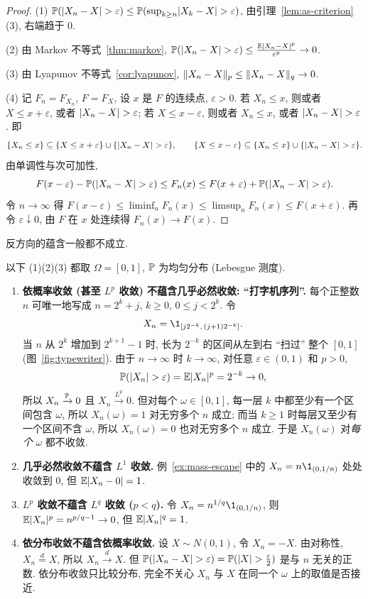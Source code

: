\begin{proof}
(1) $\P(\abs{X_n-X}>\varepsilon)\le\P(\sup_{k\ge n}\abs{X_k-X}>\varepsilon)$, 由引理~\ref{lem:as-criterion} (3), 右端趋于 $0$.

(2) 由 Markov 不等式~\ref{thm:markov}, $\P(\abs{X_n-X}>\varepsilon)\le\frac{\E\abs{X_n-X}^p}{\varepsilon^p}\to0$.

(3) 由 Lyapunov 不等式~\ref{cor:lyapunov}, $\norm{X_n-X}_p\le\norm{X_n-X}_q\to0$.

(4) 记 $F_n=F_{X_n}$, $F=F_X$, 设 $x$ 是 $F$ 的连续点, $\varepsilon>0$. 若 $X_n\le x$, 则或者 $X\le x+\varepsilon$, 或者 $\abs{X_n-X}>\varepsilon$; 若 $X\le x-\varepsilon$, 则或者 $X_n\le x$, 或者 $\abs{X_n-X}>\varepsilon$. 即
\[
\{X_n\le x\}\subseteq\{X\le x+\varepsilon\}\cup\{\abs{X_n-X}>\varepsilon\},\qquad
\{X\le x-\varepsilon\}\subseteq\{X_n\le x\}\cup\{\abs{X_n-X}>\varepsilon\}.
\]
由单调性与次可加性,
\[
F(x-\varepsilon)-\P(\abs{X_n-X}>\varepsilon)\le F_n(x)\le F(x+\varepsilon)+\P(\abs{X_n-X}>\varepsilon).
\]
令 $n\to\infty$ 得 $F(x-\varepsilon)\le\liminf_n F_n(x)\le\limsup_n F_n(x)\le F(x+\varepsilon)$. 再令 $\varepsilon\downarrow0$, 由 $F$ 在 $x$ 处连续得 $F_n(x)\to F(x)$.
\end{proof}

反方向的蕴含一般都不成立.

\begin{example}[反例]\label{ex:convergence-counterexamples}
以下 (1)(2)(3) 都取 $\Omega=[0,1]$, $\P$ 为均匀分布 (Lebesgue 测度).
\begin{enumerate}
\item \textbf{依概率收敛 (甚至 $L^p$ 收敛) 不蕴含几乎必然收敛: ``打字机序列''.} 每个正整数 $n$ 可唯一地写成 $n=2^k+j$, $k\ge0$, $0\le j<2^k$. 令
\[
X_n=\1_{[j2^{-k},\,(j+1)2^{-k}]}.
\]
当 $n$ 从 $2^k$ 增加到 $2^{k+1}-1$ 时, 长为 $2^{-k}$ 的区间从左到右 ``扫过'' 整个 $[0,1]$ (图~\ref{fig:typewriter}). 由于 $n\to\infty$ 时 $k\to\infty$, 对任意 $\varepsilon\in(0,1)$ 和 $p>0$,
\[
\P(\abs{X_n}>\varepsilon)=\E\abs{X_n}^p=2^{-k}\to0,
\]
所以 $X_n\xrightarrow{\P}0$ 且 $X_n\xrightarrow{L^p}0$. 但对每个 $\omega\in[0,1]$, 每一层 $k$ 中都至少有一个区间包含 $\omega$, 所以 $X_n(\omega)=1$ 对无穷多个 $n$ 成立; 而当 $k\ge1$ 时每层又至少有一个区间不含 $\omega$, 所以 $X_n(\omega)=0$ 也对无穷多个 $n$ 成立. 于是 $X_n(\omega)$ 对\emph{每个} $\omega$ 都不收敛.
\item \textbf{几乎必然收敛不蕴含 $L^1$ 收敛.} 例~\ref{ex:mass-escape} 中的 $X_n=n\1_{(0,1/n)}$ 处处收敛到 $0$, 但 $\E\abs{X_n-0}=1$.
\item \textbf{$L^p$ 收敛不蕴含 $L^q$ 收敛 ($p<q$).} 令 $X_n=n^{1/q}\1_{(0,1/n)}$, 则 $\E\abs{X_n}^p=n^{p/q-1}\to0$, 但 $\E\abs{X_n}^q=1$.
\item \textbf{依分布收敛不蕴含依概率收敛.} 设 $X\sim N(0,1)$, 令 $X_n=-X$. 由对称性, $X_n\overset{d}{=}X$, 所以 $X_n\xrightarrow{d}X$. 但 $\P(\abs{X_n-X}>\varepsilon)=\P(\abs{X}>\frac{\varepsilon}{2})$ 是与 $n$ 无关的正数. 依分布收敛只比较分布, 完全不关心 $X_n$ 与 $X$ 在同一个 $\omega$ 上的取值是否接近.
\end{enumerate}
\end{example}

